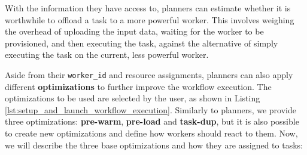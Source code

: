 \documentclass[conference]{IEEEtran}
\begin{document}
With the information they have access to, planners can estimate whether it is worthwhile to offload a task to a more powerful worker. This involves weighing the overhead of uploading the input data, waiting for the worker to be provisioned, and then executing the task, against the alternative of simply executing the task on the current, less powerful worker.

Aside from their \texttt{worker\_id} and resource assignments, planners can also apply different \textbf{optimizations} to further improve the workflow execution. The optimizations to be used are selected by the user, as shown in Listing \ref{lst:setup_and_launch_workflow_execution}. Similarly to planners, we provide three optimizations: \textbf{pre-warm}, \textbf{pre-load} and \textbf{task-dup}, but it is also possible to create new optimizations and define how workers should react to them. Now, we will describe the three base optimizations and how they are assigned to tasks:
\end{document}
